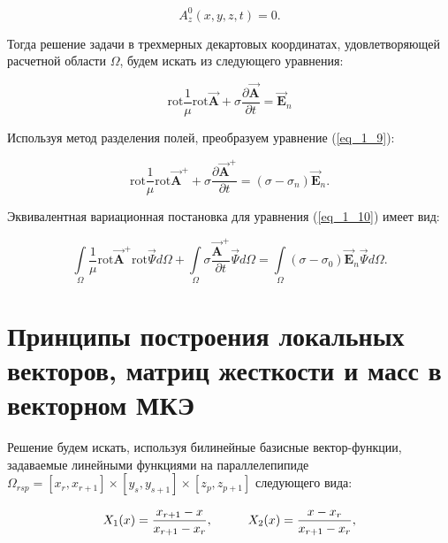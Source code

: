 \begin{equation} \label{eq_1_8}
	A_z^0(x, y, z, t) = 0.
\end{equation}

Тогда решение задачи в трехмерных декартовых координатах, удовлетворяющей расчетной области $\Omega$, будем искать из следующего уравнения:

\begin{equation} \label{eq_1_9}
	\text{rot} \frac{1}{\mu} \text{rot} \overrightarrow{\textbf{A}} + \sigma \frac{\partial \overrightarrow{\textbf{A}}}{\partial t} = \overrightarrow{\textbf{E}}_{n}
\end{equation}

Используя метод разделения полей, преобразуем уравнение (\ref{eq_1_9}):

\begin{equation} \label{eq_1_10}
	\text{rot} \frac{1}{\mu} \text{rot} \overrightarrow{\textbf{A}}^{+} + \sigma \frac{\partial \overrightarrow{\textbf{A}}^{+}}{\partial t} = (\sigma - \sigma_{n}) \overrightarrow{\textbf{E}}_{n}.
\end{equation}

Эквивалентная вариационная постановка для уравнения (\ref{eq_1_10}) имеет вид:

\begin{equation} \label{eq_1_11}
	\int \limits_{\Omega} \frac{1}{\mu} \text{rot} \overrightarrow{\textbf{A}}^{+} \text{rot} \overrightarrow{\textbf{$\Psi$}} d \Omega + \int \limits_{\Omega} \sigma \frac{\overrightarrow{\textbf{A}}^{+}}{\partial t} \overrightarrow{\textbf{$\Psi$}}  d \Omega = \int \limits_{\Omega} (\sigma - \sigma_0) \overrightarrow{\textbf{E}}_{n} \overrightarrow{\textbf{$\Psi$}}  d \Omega.
\end{equation}

\section{Принципы построения локальных векторов, матриц жесткости и масс в векторном МКЭ}

Решение будем искать, используя билинейные базисные вектор-функции, задаваемые линейными функциями на параллелепипиде $\Omega_{rsp} = [x_r, x_{r+1}] \times [y_s, y_{s+1}] \times [z_p, z_{p+1}]$ следующего вида:

\begin{equation} \label{eq_1_12}
	X_1(x) = \frac{x_{r + 1} - x}{x_{r + 1} - x_r}, \hspace{10mm} X_2(x) = \frac{x - x_r}{x_{r + 1} - x_r},
\end{equation}

